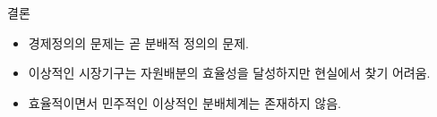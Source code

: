 \documentclass[aspectratio=169,xcolor=dvipsnames,handout]{beamer}
\begin{document}
\begin{frame}{결론}
    \begin{itemize}
        \item 경제정의의 문제는 곧 분배적 정의의 문제.
        \item 이상적인 시장기구는 자원배분의 효율성을 달성하지만 현실에서 찾기 어려움.
        \item 효율적이면서 민주적인 이상적인 분배체계는 존재하지 않음.
    \end{itemize}
\end{frame}


\end{document}
